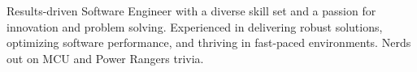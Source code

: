 

\begin{cvparagraph}

Results-driven Software Engineer with a diverse skill set and a passion for innovation and problem solving. Experienced in delivering robust solutions, optimizing software performance, and thriving in fast-paced environments. Nerds out on MCU and Power Rangers trivia.
\end{cvparagraph}

